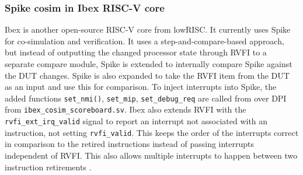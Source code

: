 %
%


\subsubsection{Spike cosim in Ibex RISC-V core}
\label{back:Ibex}

Ibex is another open-source RISC-V core from lowRISC. It currently uses Spike for co-simulation and verification. It uses a step-and-compare-based approach, but instead of outputting the changed processor state through RVFI to a separate compare module, Spike is extended to internally compare Spike against the DUT changes. Spike is also expanded to take the RVFI item from the DUT as an input and use this for comparison. To inject interrupts into Spike, the added functions \lstinline{set_nmi()}, \lstinline{set_mip}, \lstinline{set_debug_req} are called from over DPI from \lstinline{ibex_cosim_scoreboard.sv}.
Ibex also extends RVFI with the \lstinline{rvfi_ext_irq_valid} signal to report an interrupt not associated with an instruction, not setting \lstinline{rvfi_valid}. This keeps the order of the interrupts correct in comparison to the retired instructions instead of passing interrupts independent of RVFI. This also allows multiple interrupts to happen between two instruction retirements \cite{ethzurichanduniversityofbolognaCosimulationSystem2023}. 

